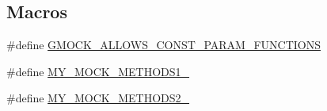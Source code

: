 \subsection*{Macros}
\begin{DoxyCompactItemize}
\item 
\#define \hyperlink{gmock-generated-function-mockers__test_8cc_af5ea000ce48c75251a5542898a872339}{G\+M\+O\+C\+K\+\_\+\+A\+L\+L\+O\+W\+S\+\_\+\+C\+O\+N\+S\+T\+\_\+\+P\+A\+R\+A\+M\+\_\+\+F\+U\+N\+C\+T\+I\+O\+NS}
\item 
\#define \hyperlink{gmock-generated-function-mockers__test_8cc_a9ae68063487fddb9f678e66728fae155}{M\+Y\+\_\+\+M\+O\+C\+K\+\_\+\+M\+E\+T\+H\+O\+D\+S1\+\_\+}
\item 
\#define \hyperlink{gmock-generated-function-mockers__test_8cc_ac36252ad7584222cebc036d56465d652}{M\+Y\+\_\+\+M\+O\+C\+K\+\_\+\+M\+E\+T\+H\+O\+D\+S2\+\_\+}
\end{DoxyCompactItemize}
